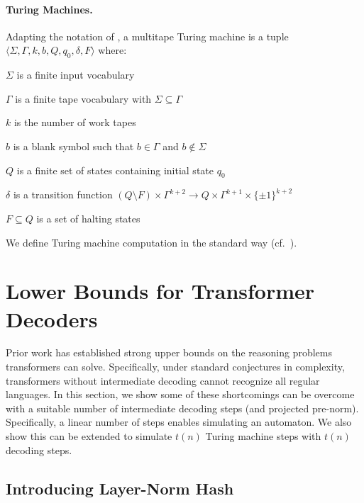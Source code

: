 \documentclass{article} %
\newcommand\changeC[1]{{\color{teal} #1}}
\renewcommand\changeC[1]{#1}
\begin{document}

\paragraph{Turing Machines.} Adapting the notation of \citet{hopcroft2001introduction}, a multitape Turing machine is a tuple $\langle \Sigma, \Gamma,k, b, Q, q_0, \delta, F \rangle$ where:

\begin{compactenum}
    \item $\Sigma$ is a finite input vocabulary
    \item $\Gamma$ is a finite tape vocabulary with $\Sigma \subseteq \Gamma$
    \item $k$ is the number of work tapes
    \item $b$ is a blank symbol such that $b \in \Gamma$ and $b \not\in \Sigma$
    \item $Q$ is a finite set of states containing initial state $q_0$
    \item $\delta$ is a transition function $(Q \setminus F) \times \Gamma^{k+2} \to Q \times \Gamma^{k+1} \times \{\pm 1\}^{k+2}$
    \item $F \subseteq Q$ is a set of halting states
\end{compactenum}
\changeC{We define Turing machine computation in the standard way (cf.~\Cref{app:turing-machines}).}

\section{Lower Bounds for Transformer Decoders}

Prior work \citep{merrill2023logic} has established strong upper bounds on the reasoning problems transformers can solve. Specifically, under standard conjectures in complexity, transformers without intermediate decoding cannot recognize all regular languages.
% 
In this section, we show some of these shortcomings can be overcome with a suitable number of intermediate decoding steps \changeC{(and projected pre-norm)}. Specifically, a linear number of steps enables simulating an automaton. We also show this can be extended
to simulate $t(n)$ Turing machine steps with $t(n)$ decoding steps.

\subsection{Introducing Layer-Norm Hash} \label{sec:lnorm-hash}
\end{document}
